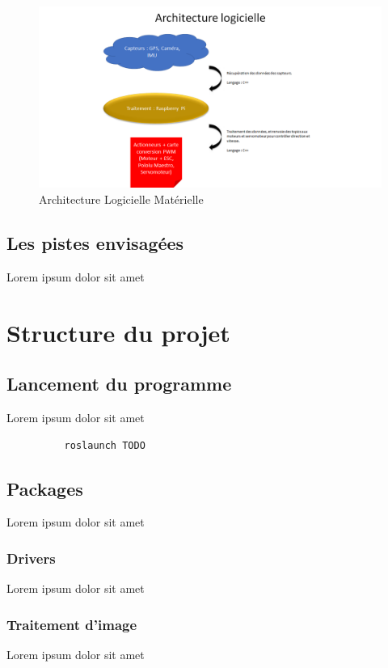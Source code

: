 \documentclass[12pt, openany]{report}
\begin{document}
      \begin{figure}[H]
      \begin{center}
        \hfill \includegraphics[scale=0.6]{img/Architecture_Logicielle_Materielle.png} \hspace*{\fill}
        \caption{Architecture Logicielle Matérielle}
      \end{center}
      \end{figure}


\subsection{Les pistes envisagées}
Lorem ipsum dolor sit amet

\section{Structure du projet}
\subsection{Lancement du programme}
Lorem ipsum dolor sit amet

\begin{lstlisting}
          roslaunch TODO
    \end{lstlisting}

\subsection{Packages}
Lorem ipsum dolor sit amet

\subsubsection{Drivers}
Lorem ipsum dolor sit amet

\subsubsection{Traitement d'image}
Lorem ipsum dolor sit amet
\end{document}
